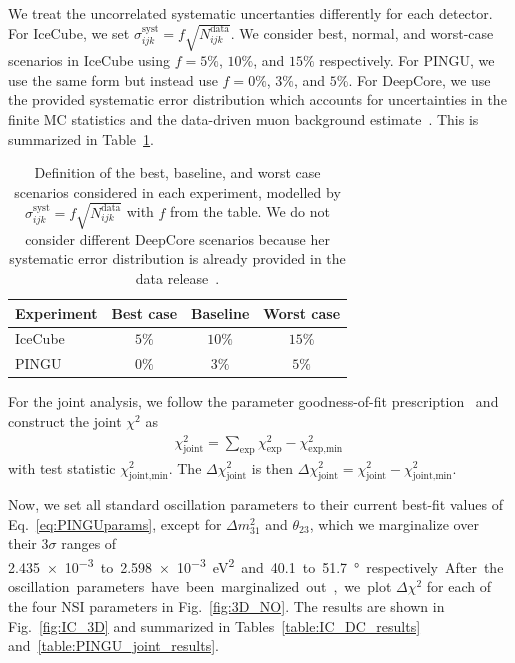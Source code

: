 \documentclass[draft=True]{revtex4-2}
\newcommand{\dm}{\Delta m^2_{31}}
\begin{document}
We treat the uncorrelated systematic uncertanties differently for each detector. For IceCube, we set $\sigma_{ijk}^\text{syst} = f\sqrt{N_{ijk}^\text{data}}$.
We consider best, normal, and worst-case scenarios in IceCube using
$f=5\%$, $10\%$, and $15\%$ respectively. For PINGU, we use the same form but instead use $f=0\%$, $3\%$, and $5\%$. %
For DeepCore, we use the provided systematic error distribution which accounts for uncertainties in the finite MC statistics and the data-driven 
muon background estimate~\cite{DC2019data}. This is summarized in Table~\ref{table:syst_errors}.  %
{\renewcommand{\arraystretch}{1.2}
\begin{table}
   \begin{tabular}{lccc}
      \hline \hline
      Experiment & Best case & Baseline & Worst case \\
      \hline
      IceCube & $5\%$ & $10\%$ & $15\%$ \\
      PINGU & $0\%$ & $3\%$ & $5\%$ \\
      \hline \hline
   \end{tabular}
   \caption{Definition of the best, baseline, and worst case scenarios considered in each experiment, modelled by $\sigma_{ijk}^\text{syst} = f\sqrt{N_{ijk}^\text{data}}$ with $f$ from the table.
   We do not consider different DeepCore scenarios because her systematic error distribution is already provided in the data release~\cite{DC2019data}.}\label{table:syst_errors}
\end{table}

For the joint analysis, we follow the parameter goodness-of-fit prescription~\cite{maltoni2003} and construct the joint $\chi^2$ as 
\begin{align}\label{eq:joint_chisq}
    \chi^2_\text{joint} = \sum_\text{exp}\chi^2_\text{exp} - \chi^2_\text{exp,min}\,
\end{align}
with test statistic $\chi^2_\text{joint,min}$. The $\Delta \chi^2_\text{joint}$ is then $\Delta \chi^2_\text{joint} = \chi^2_\text{joint} - \chi^2_\text{joint,min}$.

Now, we set all standard oscillation parameters to their current best-fit values of Eq.~\ref{eq:PINGUparams}, except for $\dm$ and $\theta_{23}$, 
which we marginalize over their $3\sigma$ ranges of \SI{2.435e-3} to \SI{2.598e-3}{\electronvolt^2} and \SI{40.1} to \SI{51.7}{\degree} respectively. %
After the oscillation parameters have been marginalized out, we plot $\Delta \chi^2$ for each of the four NSI parameters in Fig.~\ref{fig:3D_NO}. The results are shown in Fig.~\ref{fig:IC_3D} and summarized in Tables~\ref{table:IC_DC_results} and~\ref{table:PINGU_joint_results}.

}
\end{document}
